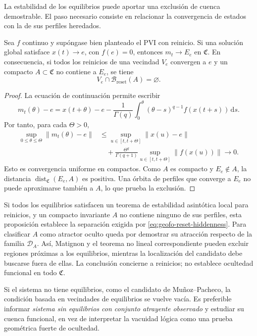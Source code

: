 La estabilidad de los equilibrios puede aportar una exclusión de cuenca
demostrable. El paso necesario consiste en relacionar la convergencia de
estados con la de sus perfiles heredados.

\begin{proposition}
\label{prop:geofo-reset-equilibrium-separation}
Sea \(f\) continuo y supóngase bien planteado el PVI con reinicio. Si una
solución global satisface \(x(t)\to e\), con \(f(e)=0\), entonces
\(m_t\to E_e\) en \(\mathfrak C\). En consecuencia, si todos los
reinicios de una vecindad \(V_e\) convergen a \(e\) y un compacto
\(A\subset\mathfrak C\) no contiene a \(E_e\), se tiene
\[
 V_e\cap\mathcal B_{\mathrm{reset}}(A)=\varnothing.
\]
\end{proposition}

\begin{proof}
La ecuación de continuación permite escribir
\[
 m_t(\theta)-e=x(t+\theta)-e
 -\frac1{\Gamma(q)}\int_0^\theta
   (\theta-s)^{q-1}f(x(t+s))\,\mathrm ds.
\]
Por tanto, para cada \(\Theta>0\),
\begin{align*}
 \sup_{0\leq\theta\leq\Theta}\|m_t(\theta)-e\|
 &\leq\sup_{u\in[t,t+\Theta]}\|x(u)-e\|\\
 &\quad+\frac{\Theta^q}{\Gamma(q+1)}
       \sup_{u\in[t,t+\Theta]}\|f(x(u))\|
 \longrightarrow0.
\end{align*}
Esto es convergencia uniforme en compactos. Como \(A\) es compacto y
\(E_e\notin A\), la distancia
\(\operatorname{dist}_{\mathfrak C}(E_e,A)\) es positiva.
Una órbita de perfiles que converge a \(E_e\) no puede aproximarse también
a \(A\), lo que prueba la exclusión.
\end{proof}

Si todos los equilibrios satisfacen un teorema de estabilidad asintótica local
para reinicios, y un compacto invariante \(A\) no contiene ninguno de sus
perfiles, esta proposición establece la separación exigida por
\cref{eq:geofo-reset-hiddenness}. Para clasificar \(A\) como atractor
oculto queda por demostrar su atracción respecto de la familia
\(\mathcal D_A\). Así, Matignon y el teorema no lineal correspondiente
pueden excluir regiones próximas a los equilibrios, mientras la localización
del candidato debe buscarse fuera de ellas. La conclusión concierne a
reinicios; no establece ocultedad funcional en todo \(\mathfrak C\).

Si el sistema no tiene equilibrios, como el candidato de Muñoz--Pacheco, la
condición basada en vecindades de equilibrios se vuelve vacía. Es preferible
informar \emph{sistema sin equilibrios con conjunto atrayente observado} y
estudiar su cuenca funcional, en vez de interpretar la vacuidad lógica como
una prueba geométrica fuerte de ocultedad.


